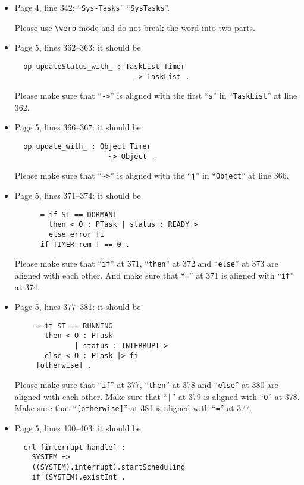 \documentclass[12pt,onecolumn]{IEEEtranTIE}
\begin{document}
\begin{itemize}
\item Page 4, line 342: ``\verb|Sys-Tasks|'' \by ``\verb|SysTasks|''.

Please use \verb|\verb| mode and do not break the word into two parts.


\item Page 5, lines 362--363: it should be
\begin{verbatim}
  op updateStatus_with_ : TaskList Timer 
                            -> TaskList . 
\end{verbatim}

Please make sure that ``\verb|->|'' is aligned with the first
``\verb|s|'' in ``\verb|TaskList|'' at line 362.

\item Page 5, lines 366--367: it should be
\begin{verbatim}
  op update_with_ : Object Timer 
                      ~> Object .
\end{verbatim}

Please make sure that ``\verb|~>|'' is aligned with the ``\verb|j|''
in ``\verb|Object|'' at line 366.


\item Page 5, lines 371--374: it should be
\begin{verbatim}
      = if ST == DORMANT 
        then < O : PTask | status : READY >
        else error fi
      if TIMER rem T == 0 .
\end{verbatim}

Please make sure that ``\verb|if|'' at 371, ``\verb|then|'' at 372 and
``\verb|else|'' at 373 are aligned with each other. And make sure that
``\verb|=|'' at 371 is aligned with ``\verb|if|'' at 374.


\item Page 5, lines 377--381: it should be
\begin{verbatim}
     = if ST == RUNNING 
       then < O : PTask 
              | status : INTERRUPT >
       else < O : PTask |> fi 
     [otherwise] .
\end{verbatim}

Please make sure that ``\verb|if|'' at 377, ``\verb|then|'' at 378 and
``\verb|else|'' at 380 are aligned with each other. Make sure that
``\verb+|+'' at 379 is aligned with ``\verb|O|'' at 378. Make sure
that ``\verb|[otherwise]|'' at 381 is aligned with ``\verb|=|'' at
377.


\item Page 5, lines 400--403: it should be
\begin{verbatim}
  crl [interrupt-handle] :
    SYSTEM =>  
    ((SYSTEM).interrupt).startScheduling
    if (SYSTEM).existInt .
\end{verbatim}


\end{itemize}
\end{document}
